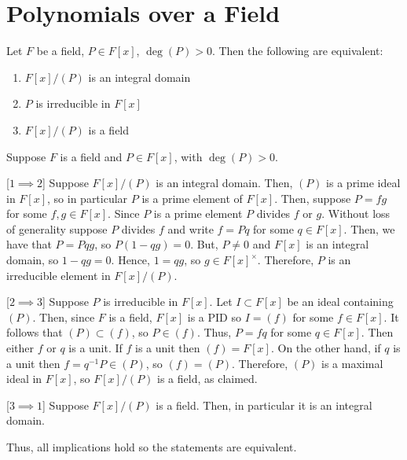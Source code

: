 \documentclass[12pt, a4paper, twoside, openright, titlepage]{book}
\begin{document}
\section{\textsection Polynomials over a Field}

\begin{thm}{}{}
    Let $F$ be a field, $P \in F[x]$, $\deg(P) > 0$. Then the following are equivalent:\begin{enumerate}
        \item $F[x]/(P)$ is an integral domain
        \item $P$ is irreducible in $F[x]$
        \item $F[x]/(P)$ is a field
    \end{enumerate}
\end{thm}
\begin{proof*}{}{}
    Suppose $F$ is a field and $P \in F[x]$, with $\deg(P) > 0$.
    
    [$1 \implies 2$] Suppose $F[x]/(P)$ is an integral domain. Then, $(P)$ is a prime ideal in $F[x]$, so in particular $P$ is a prime element of $F[x]$. Then, suppose $P = fg$ for some $f,g \in F[x]$. Since $P$ is a prime element $P$ divides $f$ or $g$. Without loss of generality suppose $P$ divides $f$ and write $f = Pq$ for some $q \in F[x]$. Then, we have that $P = Pqg$, so $P(1-qg) = 0$. But, $P \neq 0$ and $F[x]$ is an integral domain, so $1-qg = 0$. Hence, $1 = qg$, so $g \in F[x]^{\times}$. Therefore, $P$ is an irreducible element in $F[x]/(P)$.
    
    
    [$2 \implies 3$] Suppose $P$ is irreducible in $F[x]$. Let $I \subset F[x]$ be an ideal containing $(P)$. Then, since $F$ is a field, $F[x]$ is a PID so $I = (f)$ for some $f \in F[x]$. It follows that $(P) \subset (f)$, so $P \in (f)$. Thus, $P = fq$ for some $q \in F[x]$. Then either $f$ or $q$ is a unit. If $f$ is a unit then $(f) = F[x]$. On the other hand, if $q$ is a unit then $f = q^{-1}P \in (P)$, so $(f) = (P)$. Therefore, $(P)$ is a maximal ideal in $F[x]$, so $F[x]/(P)$ is a field, as claimed.
    
    
    [$3 \implies 1$] Suppose $F[x]/(P)$ is a field. Then, in particular it is an integral domain.
    
    Thus, all implications hold so the statements are equivalent.
\end{proof*}
\end{document}
